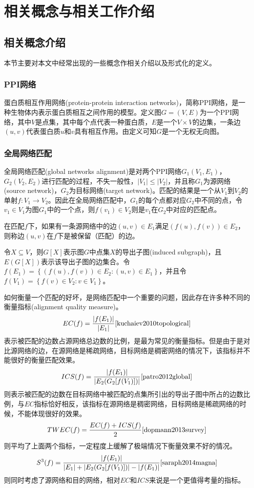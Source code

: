 \chapter{相关概念与相关工作介绍}

\section{相关概念介绍}
本节主要对本文中经常出现的一些概念作相关介绍以及形式化的定义。

\subsection{PPI网络}
蛋白质相互作用网络(protein-protein interaction networks)，简称PPI网络，是一种生物体内表示蛋白质相互之间作用的模型。定义图$G=(V,E)$为一个PPI网络，其中$V$是点集，其中每个点代表一种蛋白质，$E$是一个$V×V$的边集，一条边$(u,v)$代表蛋白质$u$和$v$具有相互作用。由定义可知$G$是一个无权无向图。
\subsection{全局网络匹配}
全局网络匹配(global networks alignment)是对两个PPI网络$G_1(V_1,E_1)$，$G_2(V_2,E_2)$进行匹配的过程，不失一般性，$|V_1|\leq|V_2|$，并且称$G_1$为源网络(source network)，$G_2$为目标网络(target network)。匹配的结果是一个从$V_1$到$V_2$的单射$f:V_1\rightarrow V_2$。因此在全局网络匹配中，$G_1$的每个点都对应$G_2$中不同的点，令$v_1\in V_1$为图$G_1$中的一个点，则$f(v_1)\in V_2$则是$v_1$在$G_2$中对应的匹配点。

在匹配$f$下，如果有一条源网络中的边$(u,v)\in E_1$满足$(f(u),f(v))\in E_2$，则称边$(u,v)$在$f$下是被保留（匹配）的边。

令$X\subseteq V$，则$G[X]$表示图$G$中点集$X$的导出子图(induced subgraph)，且$E(G[X])$表示该导出子图的边集合。令$f(E_1)=\left \{(f(u),f(v))\in E_2:(u,v)\in E_1\right \}$，并且令$f(V_1)=\left\{f(v)\in V_2:v\in V_1\right\}$。

如何衡量一个匹配的好坏，是网络匹配中一个重要的问题，因此存在许多种不同的衡量指标(alignment quality measure)。
$$EC(f)=\frac{\left | f(E_1) \right |}{\left | E_1 \right |}\cite{kuchaiev2010topological}$$表示被匹配的边数占源网络总边数的比例，是最为常见的衡量指标。但是由于是对比源网络的边，在源网络是稀疏网络，目标网络是稠密网络的情况下，该指标并不能很好的衡量匹配效果。
$$ICS(f)=\frac{\left | f(E_1) \right |}{\left |E_2(G_2[f(V_1)])\right |}\cite{patro2012global}$$则表示被匹配的边数在目标网络中被匹配的点集所引出的导出子图中所占的边数比例，与$EC$指标恰好相反，该指标在源网络是稠密网络，目标网络是稀疏网络的时候，不能体现很好的效果。
$$TWEC(f)=\frac{EC(f)+ICS(f)}{2}\cite{dopmann2013survey}$$则平均了上面两个指标，一定程度上缓解了极端情况下衡量效果不好的情况。
$$S^{3}(f)=\frac{\left | f(E_1) \right |}{\left | E_1 \right |+\left | E_2(G_2[f(V_1)]) \right |-\left | f(E_1) \right |}\cite{saraph2014magna}$$则同时考虑了源网络和目的网络，相对$EC$和$ICS$来说是一个更值得考量的指标。

